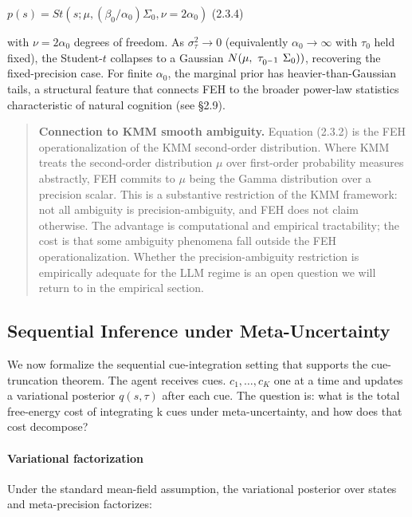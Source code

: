 \documentclass{article}
\begin{document}
\(p(s) = St\left( s;\mu,\left( \beta_{0}\text{/}\alpha_{0} \right)\Sigma_{0},\nu = 2\alpha_{0} \right)\)
(2.3.4)

with \(\nu = 2\alpha_{0}\) degrees of freedom. As
\(\sigma_{\tau}^{2} \rightarrow 0\) (equivalently
\(\alpha_{0} \rightarrow \infty\) with \(\tau_{0}\) held fixed), the
Student-\(t\) collapses to a Gaussian
\(N(\mu,\ \tau_{0\ensuremath{^{-}}\textsuperscript{1}}\ \Sigma_{0}))\), recovering the fixed-precision
case. For finite \(\alpha_{0}\), the marginal prior has
heavier-than-Gaussian tails, a structural feature that connects FEH to
the broader power-law statistics characteristic of natural cognition
(see \S{}2.9).

\begin{quote}
\textbf{Connection to KMM smooth ambiguity.} Equation (2.3.2) is the FEH
operationalization of the KMM second-order distribution. Where KMM
treats the second-order distribution \(\mu\) over first-order
probability measures abstractly, FEH commits to \(\mu\) being the Gamma
distribution over a precision scalar. This is a substantive restriction
of the KMM framework: not all ambiguity is precision-ambiguity, and FEH
does not claim otherwise. The advantage is computational and empirical
tractability; the cost is that some ambiguity phenomena fall outside the
FEH operationalization. Whether the precision-ambiguity restriction is
empirically adequate for the LLM regime is an open question we will
return to in the empirical section.
\end{quote}

\subsection{Sequential Inference under
Meta-Uncertainty}\label{sequential-inference-under-meta-uncertainty}

We now formalize the sequential cue-integration setting that supports
the cue-truncation theorem. The agent receives cues.
\(c_{1},\ldots,c_{K}\) one at a time and updates a variational posterior
\(q(s,\tau)\) after each cue. The question is: what is the total
free-energy cost of integrating k cues under meta-uncertainty, and how
does that cost decompose?

\paragraph{Variational factorization}\label{variational-factorization}

Under the standard mean-field assumption, the variational posterior over
states and meta-precision factorizes:
\end{document}
